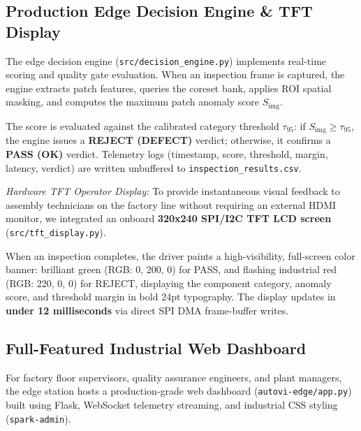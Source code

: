 \documentclass[journal,twocolumn]{IEEEtran}
\begin{document}
\subsection{Production Edge Decision Engine & TFT Display}
The edge decision engine (\texttt{src/decision\_engine.py}) implements real-time scoring and quality gate evaluation. When an inspection frame is captured, the engine extracts patch features, queries the coreset bank, applies ROI spatial masking, and computes the maximum patch anomaly score $S_{\text{img}}$.

The score is evaluated against the calibrated category threshold $\tau_{95}$: if $S_{\text{img}} \ge \tau_{95}$, the engine issues a \textbf{REJECT (DEFECT)} verdict; otherwise, it confirms a \textbf{PASS (OK)} verdict. Telemetry logs (timestamp, score, threshold, margin, latency, verdict) are written unbuffered to \texttt{inspection\_results.csv}.

\textit{Hardware TFT Operator Display:} To provide instantaneous visual feedback to assembly technicians on the factory line without requiring an external HDMI monitor, we integrated an onboard \textbf{320x240 SPI/I2C TFT LCD screen} (\texttt{src/tft\_display.py}).

When an inspection completes, the driver paints a high-visibility, full-screen color banner: brilliant green (RGB: 0, 200, 0) for PASS, and flashing industrial red (RGB: 220, 0, 0) for REJECT, displaying the component category, anomaly score, and threshold margin in bold 24pt typography. The display updates in \textbf{under 12 milliseconds} via direct SPI DMA frame-buffer writes.

\subsection{Full-Featured Industrial Web Dashboard}
For factory floor supervisors, quality assurance engineers, and plant managers, the edge station hosts a production-grade web dashboard (\texttt{autovi-edge/app.py}) built using Flask, WebSocket telemetry streaming, and industrial CSS styling (\texttt{spark-admin}).
\end{document}
